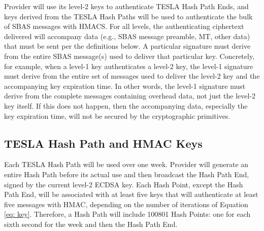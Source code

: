 \documentclass[letterpaper,times]{IONconf/IONconf}
\begin{document}
Provider will use its level-2 keys to authenticate TESLA Hash Path Ends, and keys derived from the TESLA Hash Paths will be used to authenticate the bulk of SBAS messages with HMACS.
For all levels, the authenticating ciphertext delivered will accompany data (e.g., SBAS message preamble, MT, other data) that must be sent per the definitions below.
A particular signature must derive from the entire SBAS message(s) used to deliver that particular key.
Concretely, for example, when a level-1 key authenticates a level-2 key, the level-1 signature must derive from the entire set of messages used to deliver the level-2 key and the accompanying key expiration time. 
In other words, the level-1 signature must derive from the complete messages containing overhead data, not just the level-2 key itself.
If this does not happen, then the accompanying data, especially the key expiration time, will not be secured by the cryptographic primitives.

\subsection{TESLA Hash Path and HMAC Keys} \label{sec: TESLA Hash Path and HMAC Keys}

Each TESLA Hash Path will be used over one week.
Provider will generate an entire Hash Path before its actual use and then broadcast the Hash Path End, signed by the current level-2 ECDSA key.
Each Hash Point, except the Hash Path End, will be associated with at least five keys that will authenticate at least five messages with HMAC, depending on the number of iterations of Equation \ref{eq: key}.
Therefore, a Hash Path will include 100801 Hash Points: one for each sixth second for the week and then the Hash Path End.
\end{document}
